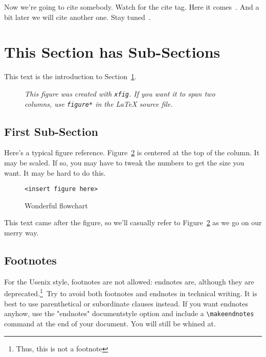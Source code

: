 \documentclass[XXX,endnotes]{usetex-v1}
\begin{document}
Now we're going to cite somebody.  Watch for the cite tag.  Here it
comes~\cite{heidrich,perl5,otcl}.  And a bit later we will cite
another one.  Stay tuned~\cite{ousterhout}.

\section{This Section has Sub-Sections}
\label{sec:secs}

This text is the introduction to Section~\ref{sec:secs}.

\begin{figure}[htbp]
\begin{centering}
\small\itshape
\caption{\small\itshape This figure was created with \texttt{xfig}.  If you
want it to span two columns, use \texttt{figure*} in the LaTeX source file.}
\label{fig-sample}
\end{centering}
\end{figure}

\subsection{First Sub-Section}

Here's a typical figure reference.  Figure~\ref{fig:flowchart} is
centered at the top of the column.  It may be scaled.  If so, you may
have to tweak the numbers to get the size you want. It may be
  hard to do this.


\begin{figure}[tb]
  \begin{center}
     \texttt{<insert figure here>}              %
    \caption{Wonderful flowchart}
    \label{fig:flowchart}
  \end{center}
\end{figure}

This text came after the figure, so we'll casually refer to
Figure~\ref{fig:flowchart} as we go on our merry way.

\HERE

\subsection{Footnotes}

For the Usenix style, footnotes are not allowed: endnotes
are, although they are
deprecated.\ifhasendnotes\footnote{Thus, this is not a
footnote}\fi\ Try to avoid both footnotes and endnotes in
technical writing.  It is best to use parenthetical or
subordinate clauses instead.  If you want endnotes anyhow,
use the "endnotes" documentstyle option and include a
\verb+\makeendnotes+ command at the end of your document.
You will still be whined at.
\end{document}
